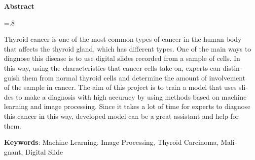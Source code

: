 

\pagestyle{empty}

\begin{latin}

    \begin{center}
        \textbf{Abstract}
    \end{center}
    \baselineskip=.8\baselineskip

    Thyroid cancer is one of the most common types of cancer in the human body that affects the thyroid gland, which has different types.
    One of the main ways to diagnose this disease is to use digital slides recorded from a sample of cells.
    In this way, using the characteristics that cancer cells take on, experts can distinguish them from normal thyroid cells and determine the amount of involvement of the sample in cancer.
    The aim of this project is to train a model that uses slides to make a diagnosis with high accuracy by using methods based on machine learning and image processing. Since it takes a lot of time for experts to diagnose this cancer in this way, developed model can be a great assistant and help for them.



    \bigskip\noindent\textbf{Keywords}:
    Machine Learning, Image Processing, Thyroid Carcinoma, Malignant, Digital Slide

\end{latin}

\newpage
